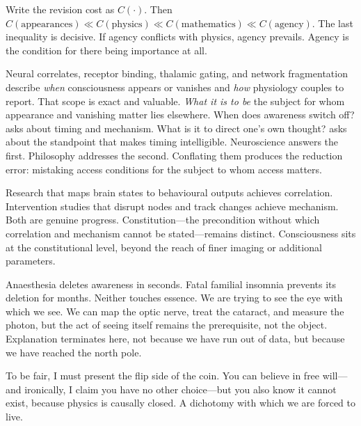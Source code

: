 Write the revision cost as $C(\cdot)$. Then $C(\text{appearances}) \ll C(\text{physics}) \ll C(\text{mathematics}) \ll C(\text{agency}).$ The last inequality is decisive. If agency conflicts with physics, agency prevails. Agency is the condition for there being importance at all.

Neural correlates, receptor binding, thalamic gating, and network fragmentation describe \textit{when} consciousness appears or vanishes and \textit{how} physiology couples to report. That scope is exact and valuable. \textit{What it is to be} the subject for whom appearance and vanishing matter lies elsewhere. \QSOpen{}When does awareness switch off?\QSClose{} asks about timing and mechanism. \QSOpen{}What is it to direct one's own thought?\QSClose{} asks about the standpoint that makes timing intelligible. Neuroscience answers the first. Philosophy addresses the second. Conflating them produces the reduction error: mistaking access conditions for the subject to whom access matters.

Research that maps brain states to behavioural outputs achieves correlation. Intervention studies that disrupt nodes and track changes achieve mechanism. Both are genuine progress. Constitution—the precondition without which correlation and mechanism cannot be stated—remains distinct. Consciousness sits at the constitutional level, beyond the reach of finer imaging or additional parameters.

Anaesthesia deletes awareness in seconds. Fatal familial insomnia prevents its deletion for months. Neither touches essence. We are trying to see the eye with which we see. We can map the optic nerve, treat the cataract, and measure the photon, but the act of seeing itself remains the prerequisite, not the object. Explanation terminates here, not because we have run out of data, but because we have reached the north pole.

To be fair, I must present the flip side of the coin. You can believe in free will—and ironically, I claim you have no other choice—but you also know it cannot exist, because physics is causally closed. A dichotomy with which we are forced to live.

